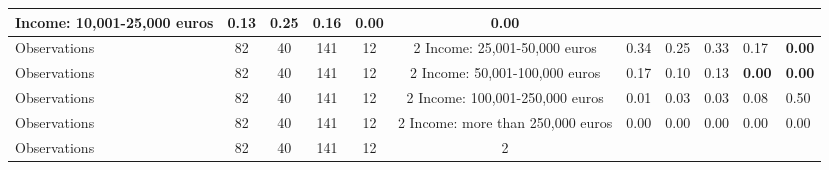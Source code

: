 \begin{tabular}{l c c c c c c }
Income: 10,001-25,000 euros &      0.13 &      0.25 &      0.16 & \textbf{     0.00} & \textbf{     0.00} \\
\midrule
Observations &        82 &        40 &       141 &        12 &         2
Income: 25,001-50,000 euros &      0.34 &      0.25 &      0.33 &      0.17 & \textbf{     0.00} \\
\midrule
Observations &        82 &        40 &       141 &        12 &         2
Income: 50,001-100,000 euros &      0.17 &      0.10 &      0.13 & \textbf{     0.00} & \textbf{     0.00} \\
\midrule
Observations &        82 &        40 &       141 &        12 &         2
Income: 100,001-250,000 euros &      0.01 &      0.03 &      0.03 &      0.08 &      0.50 \\
\midrule
Observations &        82 &        40 &       141 &        12 &         2
Income: more than 250,000 euros &      0.00 &      0.00 &      0.00 &      0.00 &      0.00 \\
\midrule
Observations &        82 &        40 &       141 &        12 &         2
\bottomrule
\end{tabular}
